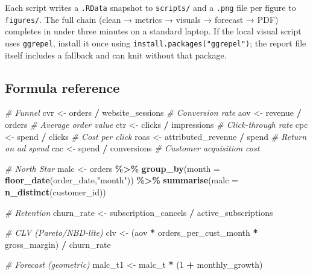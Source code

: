 \documentclass[
  11pt,
]{article}
\newenvironment{Shaded}{\begin{snugshade}}{\end{snugshade}}
\newcommand{\AttributeTok}[1]{\textcolor[rgb]{0.13,0.29,0.53}{#1}}
\newcommand{\CommentTok}[1]{\textcolor[rgb]{0.56,0.35,0.01}{\textit{#1}}}
\newcommand{\DecValTok}[1]{\textcolor[rgb]{0.00,0.00,0.81}{#1}}
\newcommand{\FunctionTok}[1]{\textcolor[rgb]{0.13,0.29,0.53}{\textbf{#1}}}
\newcommand{\NormalTok}[1]{#1}
\newcommand{\OtherTok}[1]{\textcolor[rgb]{0.56,0.35,0.01}{#1}}
\newcommand{\SpecialCharTok}[1]{\textcolor[rgb]{0.81,0.36,0.00}{\textbf{#1}}}
\newcommand{\StringTok}[1]{\textcolor[rgb]{0.31,0.60,0.02}{#1}}
\begin{document}
Each script writes a \texttt{.RData} snapshot to \texttt{scripts/} and a
\texttt{.png} file per figure to \texttt{figures/}. The full chain
(clean → metrics → visuals → forecast → PDF) completes in under three
minutes on a standard laptop. If the local visual script uses
\texttt{ggrepel}, install it once using
\texttt{install.packages("ggrepel")}; the report file itself includes a
fallback and can knit without that package.

\subsection{Formula reference}\label{formula-reference}

\begin{Shaded}
\begin{Highlighting}[]
\CommentTok{\# Funnel}
\NormalTok{cvr  }\OtherTok{\textless{}{-}}\NormalTok{ orders }\SpecialCharTok{/}\NormalTok{ website\_sessions          }\CommentTok{\# Conversion rate}
\NormalTok{aov  }\OtherTok{\textless{}{-}}\NormalTok{ revenue }\SpecialCharTok{/}\NormalTok{ orders                   }\CommentTok{\# Average order value}
\NormalTok{ctr  }\OtherTok{\textless{}{-}}\NormalTok{ clicks }\SpecialCharTok{/}\NormalTok{ impressions               }\CommentTok{\# Click{-}through rate}
\NormalTok{cpc  }\OtherTok{\textless{}{-}}\NormalTok{ spend }\SpecialCharTok{/}\NormalTok{ clicks                     }\CommentTok{\# Cost per click}
\NormalTok{roas }\OtherTok{\textless{}{-}}\NormalTok{ attributed\_revenue }\SpecialCharTok{/}\NormalTok{ spend         }\CommentTok{\# Return on ad spend}
\NormalTok{cac  }\OtherTok{\textless{}{-}}\NormalTok{ spend }\SpecialCharTok{/}\NormalTok{ conversions                }\CommentTok{\# Customer acquisition cost}

\CommentTok{\# North Star}
\NormalTok{malc }\OtherTok{\textless{}{-}}\NormalTok{ orders }\SpecialCharTok{\%\textgreater{}\%}
  \FunctionTok{group\_by}\NormalTok{(}\AttributeTok{month =} \FunctionTok{floor\_date}\NormalTok{(order\_date,}\StringTok{"month"}\NormalTok{)) }\SpecialCharTok{\%\textgreater{}\%}
  \FunctionTok{summarise}\NormalTok{(}\AttributeTok{malc =} \FunctionTok{n\_distinct}\NormalTok{(customer\_id))}

\CommentTok{\# Retention}
\NormalTok{churn\_rate }\OtherTok{\textless{}{-}}\NormalTok{ subscription\_cancels }\SpecialCharTok{/}\NormalTok{ active\_subscriptions}

\CommentTok{\# CLV (Pareto/NBD{-}lite)}
\NormalTok{clv }\OtherTok{\textless{}{-}}\NormalTok{ (aov }\SpecialCharTok{*}\NormalTok{ orders\_per\_cust\_month }\SpecialCharTok{*}\NormalTok{ gross\_margin) }\SpecialCharTok{/}\NormalTok{ churn\_rate}

\CommentTok{\# Forecast (geometric)}
\NormalTok{malc\_t1 }\OtherTok{\textless{}{-}}\NormalTok{ malc\_t }\SpecialCharTok{*}\NormalTok{ (}\DecValTok{1} \SpecialCharTok{+}\NormalTok{ monthly\_growth)}
\end{Highlighting}
\end{Shaded}
\end{document}
